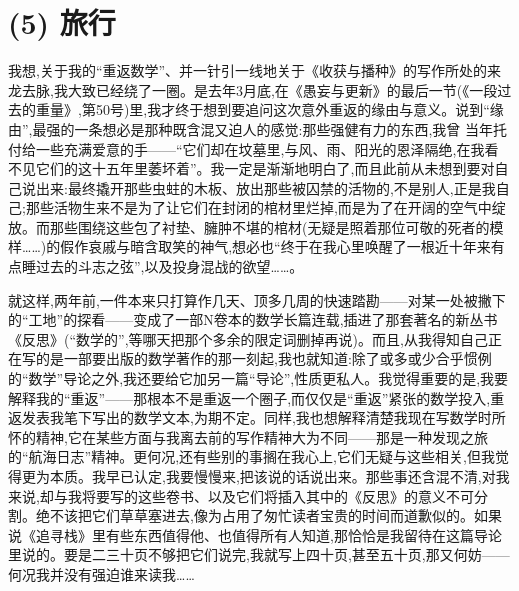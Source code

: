 \section{(5) 旅行}

我想,关于我的“重返数学”、并一针引一线地关于《收获与播种》的写作所处的来龙去脉,我大致已经绕了一圈。是去年3月底,在《愚妄与更新》的最后一节(《一段过去的重量》,第50号)里,我才终于想到要追问这次意外重返的缘由与意义。说到“缘由”,最强的一条想必是那种既含混又迫人的感觉:那些强健有力的东西,我曾
当年托付给一些充满爱意的手——“它们却在坟墓里,与风、雨、阳光的恩泽隔绝,在我看不见它们的这十五年里萎坏着”。我一定是渐渐地明白了,而且此前从未想到要对自己说出来:最终撬开那些虫蛀的木板、放出那些被囚禁的活物的,不是别人,正是我自己;那些活物生来不是为了让它们在封闭的棺材里烂掉,而是为了在开阔的空气中绽放。而那些围绕这些包了衬垫、臃肿不堪的棺材(无疑是照着那位可敬的死者的模样……)的假作哀戚与暗含取笑的神气,想必也“终于在我心里唤醒了一根近十年来有点睡过去的斗志之弦”,以及投身混战的欲望……。

就这样,两年前,一件本来只打算作几天、顶多几周的快速踏勘——对某一处被撇下的“工地”的探看——变成了一部N卷本的数学长篇连载,插进了那套著名的新丛书《反思》(“数学的”,等哪天把那个多余的限定词删掉再说)。而且,从我得知自己正在写的是一部要出版的数学著作的那一刻起,我也就知道:除了或多或少合乎惯例的“数学”导论之外,我还要给它加另一篇“导论”,性质更私人。我觉得重要的是,我要解释我的“重返”——那根本不是重返一个圈子,而仅仅是“重返”紧张的数学投入,重返发表我笔下写出的数学文本,为期不定。同样,我也想解释清楚我现在写数学时所怀的精神,它在某些方面与我离去前的写作精神大为不同——那是一种发现之旅的“航海日志”精神。更何况,还有些别的事搁在我心上,它们无疑与这些相关,但我觉得更为本质。我早已认定,我要慢慢来,把该说的话说出来。那些事还含混不清,对我来说,却与我将要写的这些卷书、以及它们将插入其中的《反思》的意义不可分割。绝不该把它们草草塞进去,像为占用了匆忙读者宝贵的时间而道歉似的。如果说《追寻栈》里有些东西值得他、也值得所有人知道,那恰恰是我留待在这篇导论里说的。要是二三十页不够把它们说完,我就写上四十页,甚至五十页,那又何妨——何况我并没有强迫谁来读我……

